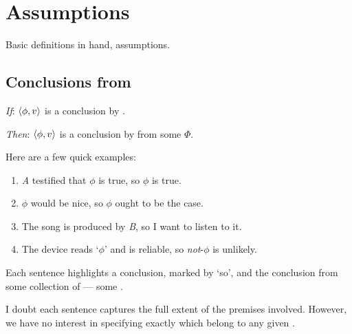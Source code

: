 \section{Assumptions}
\label{sec:assumptions}

\begin{note}
  Basic definitions in hand, assumptions.
\end{note}

\subsection{Conclusions from }
\label{sec:pools-premises}

\begin{note}
  \begin{assumption}
    \label{assu:concluding:pools}
    \vspace{-\baselineskip}
    \begin{itenum}
    \item[\emph{If}:]
      \(\langle\phi, v\rangle\) is a conclusion by \vAgent{}.
    \item[\emph{Then}:]
      \(\langle\phi, v\rangle\) is a conclusion by \vAgent{} from some \pool{} \(\Phi\).
    \end{itenum}
    \vspace{-\baselineskip}
  \end{assumption}

  \noindent%
  Here are a few quick examples:
  \begin{enumerate}[label=\arabic*., ref=(\arabic*), noitemsep]
  \item
    \emph{A} testified that \(\phi\) is true, so \(\phi\) is true.
  \item
    \(\phi\) would be nice, so \(\phi\) ought to be the case.
  \item
    The song is produced by \emph{B}, so I want to listen to it.
  \item
    The device reads `\(\phi\)' and is reliable, so \emph{not}-\(\phi\) is unlikely.
  \end{enumerate}
  Each sentence highlights a conclusion, marked by `so', and the conclusion  from some collection of  --- some \pool{}.

  I doubt each sentence captures the full extent of the premises involved.
  However, we have no interest in specifying exactly which \evalN{} belong to any given \pool{}.
\end{note}

